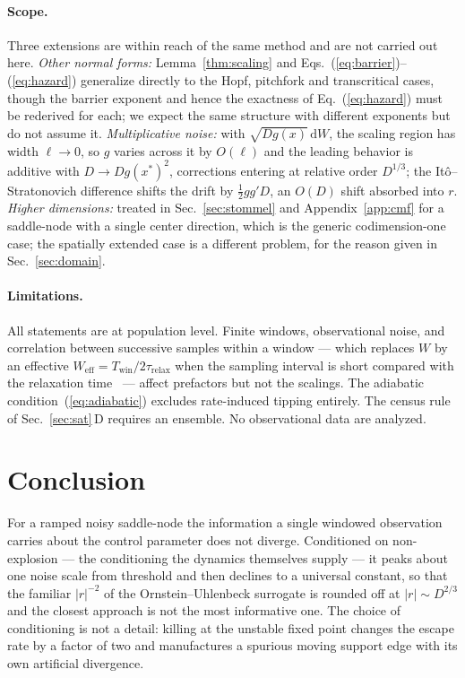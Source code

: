 \documentclass[%
 aip,
 cha,
 amsmath,amssymb,
 reprint,
 superscriptaddress,
 floatfix,
]{revtex4-2}
\newcommand{\dd}{\mathrm{d}}
\begin{document}
\paragraph{Scope.}
Three extensions are within reach of the same method and are not carried out here.  \emph{Other normal forms:} Lemma~\ref{thm:scaling} and Eqs.~(\ref{eq:barrier})--(\ref{eq:hazard}) generalize directly to the Hopf, pitchfork and transcritical cases, though the barrier exponent and hence the exactness of Eq.~(\ref{eq:hazard}) must be rederived for each; we expect the same structure with different exponents but do not assume it.  \emph{Multiplicative noise:} with $\sqrt{Dg(x)}\,\dd W$, the scaling region has width $\ell\to0$, so $g$ varies across it by $O(\ell)$ and the leading behavior is additive with $D\to Dg(x^\ast)^2$, corrections entering at relative order $D^{1/3}$; the It\^o--Stratonovich difference shifts the drift by $\tfrac12gg'D$, an $O(D)$ shift absorbed into $r$.  \emph{Higher dimensions:} treated in Sec.~\ref{sec:stommel} and Appendix~\ref{app:cmf} for a saddle-node with a single center direction, which is the generic codimension-one case; the spatially extended case is a different problem, for the reason given in Sec.~\ref{sec:domain}.

\paragraph{Limitations.}
All statements are at population level.  Finite windows, observational noise, and correlation between successive samples within a window --- which replaces $W$ by an effective $W_{\mathrm{eff}}=T_{\mathrm{win}}/2\tau_{\mathrm{relax}}$ when the sampling interval is short compared with the relaxation time~\cite{Geyer1992} --- affect prefactors but not the scalings.  The adiabatic condition~(\ref{eq:adiabatic}) excludes rate-induced tipping entirely.  The census rule of Sec.~\ref{sec:sat}\,D requires an ensemble.  No observational data are analyzed.

\section{\label{sec:conc}Conclusion}

For a ramped noisy saddle-node the information a single windowed observation carries about the control parameter does not diverge.  Conditioned on non-explosion --- the conditioning the dynamics themselves supply --- it peaks about one noise scale from threshold and then declines to a universal constant, so that the familiar $|r|^{-2}$ of the Ornstein--Uhlenbeck surrogate is rounded off at $|r|\sim D^{2/3}$ and the closest approach is not the most informative one.  The choice of conditioning is not a detail: killing at the unstable fixed point changes the escape rate by a factor of two and manufactures a spurious moving support edge with its own artificial divergence.
\end{document}
